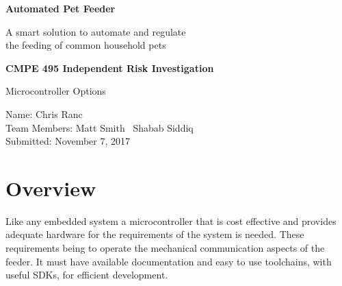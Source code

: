 \documentclass[12pt]{article}
\newcommand{\projectDescription}{A smart solution to automate and regulate \\the feeding of common household pets}
\newcommand{\projectTitle}{Automated Pet Feeder}
\newcommand{\yourname}{Chris Ranc}
\newcommand{\myname}{Matt Smith}
\newcommand{\anothername}{Shabab Siddiq}
\newcommand{\dateSubmitted}{November 7, 2017}
\newcommand{\componentDescription}{Microcontroller Options}
\begin{document}
\thispagestyle{empty}
    \vspace*{2.5cm}
    \begin{center}
        \LARGE
        \textbf{\projectTitle}

        \Large
        \projectDescription

    \vspace*{2.5cm}
        \large
        \textbf{CMPE 495 Independent Risk Investigation}

        \componentDescription
    \end{center}

    \vspace*{2cm}

    \begin{multicols}{2}
        \phantom{LaTeX doesn't like empty columns} %
        \columnbreak{}
        \begin{raggedright}

        Name: \yourname\\
        Team Members: \myname\
        \phantom{Team Members:} \anothername\\
        Submitted: \dateSubmitted\\
        \vspace{\baselineskip}
        \end{raggedright}
    \end{multicols}
\newpage
%
%
\renewcommand{\cftaftertoctitle}{\thispagestyle{empty}}
\renewcommand\cftsecleader{\cftdotfill{\cftdotsep}}
\tableofcontents
\newpage

\section{Overview}
Like any embedded system a microcontroller that is cost effective and provides adequate hardware
for the requirements of the system is needed.  These requirements being to operate the mechanical
communication aspects of the feeder.  It must have available documentation and easy to use
toolchains, with useful SDKs, for efficient development.
\end{document}
